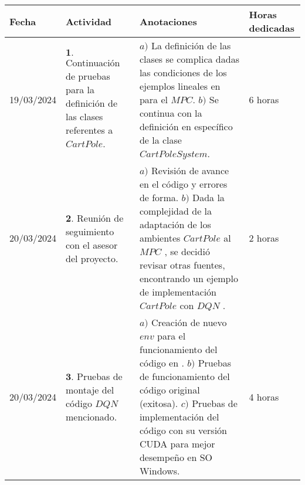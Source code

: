 \documentclass[12pt]{article}
\begin{document}
\begin{minipage}[h]{\textwidth}
	\centering
	\begin{tabularx}{\textwidth}{|p{2cm}|X|X|p{2cm}|} 
		\hline
		\rowcolor{encabezado}
		\textbf{Fecha} & 
		\textbf{Actividad} & 
		\textbf{Anotaciones} & 
		\textbf{Horas dedicadas} \\ \hline
	 	19/03/2024 & 
	 	$\mathbf{1}.$ Continuación de pruebas para la definición de las clases referentes a $CartPole$. & 
	 	$a)$ La definición de las clases se complica dadas las condiciones de los ejemplos lineales en \cite{Airdaldi2023} para el $MPC$. \newline
	 	$b)$ Se continua con la definición en específico de la clase $CartPoleSystem$. \newline & 
	 	6 horas \\
	 	20/03/2024 & 
	 	$\mathbf{2}.$ Reunión de seguimiento con el asesor del proyecto. & 
	 	$a)$ Revisión de avance en el código y errores de forma.  \newline
	 	$b)$ Dada la complejidad de la adaptación de los ambientes $CartPole$ al $MPC$ \cite{Airdaldi2023}, se decidió revisar otras fuentes, encontrando un ejemplo de implementación $CartPole$ con \href{https://pytorch.org/tutorials/intermediate/reinforcement_q_learning.html}{$DQN$} \cite{DQNCart}.  \newline & 
	 	2 horas \\
	 	20/03/2024 & 
	 	$\mathbf{3}.$ Pruebas de montaje del código $DQN$ mencionado. & 
	 	$a)$ Creación de nuevo $env$ para el funcionamiento del código en \cite{DQNCart}. \newline
	 	$b)$ Pruebas de funcionamiento del código original (exitosa). \newline
	 	$c)$ Pruebas de implementación del código con su versión CUDA para mejor desempeño en SO Windows. \newline & 
	 	4 horas \\
	 	
	 	\hline
	\end{tabularx}
\end{minipage}	 	
	 	
\end{document}
